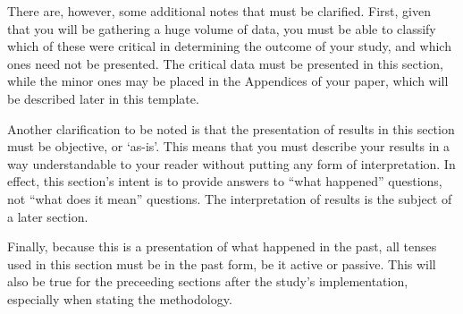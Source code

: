 There are, however, some additional notes that must be clarified. First, given that you will be gathering a huge volume of data, you must be able to classify which of these were critical in determining the outcome of your study, and which ones need not be presented. The critical data must be presented in this section, while the minor ones may be placed in the Appendices of your paper, which will be described later in this template.

Another clarification to be noted is that the presentation of results in this section must be objective, or `as-is'. This means that you must describe your results in a way understandable to your reader without putting any form of interpretation. In effect, this section’s intent is to provide answers to ``what happened'' questions, not ``what does it mean'' questions. The interpretation of results is the subject of a later section.

Finally, because this is a presentation of what happened in the past, all tenses used in this section must be in the past form, be it active or passive. This will also be true for the preceeding sections after the study’s implementation, especially when stating the methodology.
